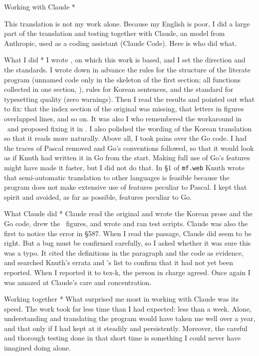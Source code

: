 {\quad Working with Claude *

This translation is not my work alone. Because my English is poor, I
did a large part of the translation and testing together with Claude,
an  model from Anthropic, used as a coding assistant (Claude
Code). Here is who did what.

\subhead * What I did *
I wrote \GWEB, on which this work is based, and I set the direction
and the standards. I wrote down in advance the rules for the structure
of the literate program (unnamed code only in the skeleton of the first
section; all functions collected in one section, ),
rules for Korean sentences, and the standard for typesetting quality
(zero warnings). Then I read the results and pointed out what to fix:
that the index section of the original was missing, that letters in
figures overlapped lines, and so on. It was also I who remembered the
workaround in \GWEB\ and proposed fixing it in \GWEB. I also polished
the wording of the Korean translation so that it reads more naturally.
Above all, I took pains over the Go code. I had the traces of Pascal
removed and Go's conventions followed, so that it would look as if
Knuth had written it in Go from the start. Making full use of Go's
features might have made it faster, but I did not do that. In \S1 of
{\tt mf.web} Knuth wrote that semi-automatic translation to other
languages is feasible because the program does not make extensive use
of features peculiar to Pascal. I kept that spirit and avoided, as far
as possible, features peculiar to Go.

\subhead * What Claude did *
Claude read the original and wrote the Korean prose and the Go code,
drew the \MP\ figures, and wrote and ran test scripts. Claude was also
the first to notice the error in \S587. When I read the passage,
Claude did seem to be right. But a bug must be confirmed carefully, so
I asked whether it was sure this was a typo. It cited the definitions
in the paragraph and the code as evidence, and searched Knuth's errata
and 's list to confirm that it had not yet been reported.
When I reported it to tex-k, the person in charge agreed. Once again I
was amazed at Claude's care and concentration.

\subhead * Working together *
What surprised me most in working with Claude was its speed. The work
took far less time than I had expected: less than a week. Alone,
understanding and translating the program would have taken me well
over a year, and that only if I had kept at it steadily and
persistently. Moreover, the careful and thorough testing done in that
short time is something I could never have imagined doing alone.

}
